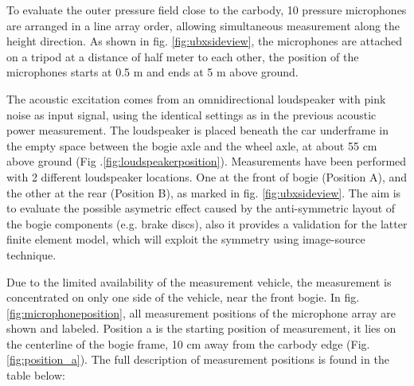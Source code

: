 To evaluate the outer pressure field close to the carbody, 10 pressure microphones are arranged in a line array order, allowing simultaneous measurement along the height direction. As shown in fig. \ref{fig:ubxsideview}, the microphones are attached on a tripod at a distance of half meter to each other, the position of the microphones starts at 0.5 m and ends at 5 m above ground.

The acoustic excitation comes from an omnidirectional loudspeaker with pink noise as input signal, using the identical settings as in the previous acoustic power measurement. The loudspeaker is placed beneath the car underframe in the empty space between the bogie axle and the wheel axle, at about 55 cm above ground (Fig .\ref{fig:loudspeakerposition}). Measurements have been performed with 2 different loudspeaker locations. One at the front of bogie (Position A), and the other at the rear (Position B), as marked in fig. \ref{fig:ubxsideview}. The aim is to evaluate the possible asymetric effect caused by the anti-symmetric layout of the bogie components (e.g. brake discs), also it provides a validation for the latter finite element model, which will exploit the symmetry using image-source technique.

Due to the limited availability of the measurement vehicle, the measurement is concentrated on only one side of the vehicle, near the front bogie. In fig. \ref{fig:microphoneposition}, all measurement positions of the microphone array are shown and labeled. Position a is the starting position of measurement, it lies on the centerline of the bogie frame, 10 cm away from the carbody edge (Fig. \ref{fig:position_a}). The full description of measurement positions is found in the table below:

